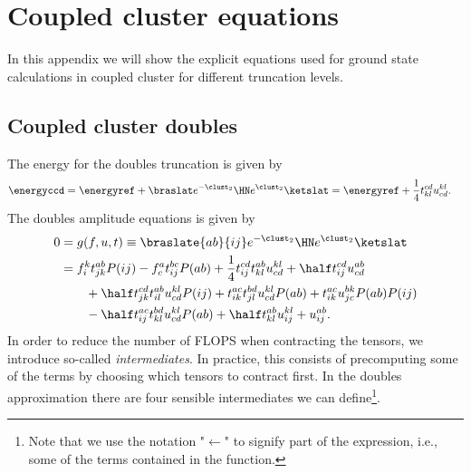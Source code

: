 \chapter{Coupled cluster equations}
    In this appendix we will show the explicit equations used for ground state
    calculations in coupled cluster for different truncation levels.

    \section{Coupled cluster doubles}
        The energy for the doubles truncation is given by
        \begin{align}
            \energyccd
            &= \energyref
            + \braslat e^{-\clust_2}\HN e^{\clust_2}\ketslat
            = \energyref
            + \frac{1}{4}t^{cd}_{kl} u^{kl}_{cd}.
        \end{align}
        The doubles amplitude equations is given by
        \begin{align}
            0 &= g(f, u, t)
            \equiv \braslate{ab}{ij}e^{-\clust_2}\HN e^{\clust_2}\ketslat
            \\
            &=
            f^{k}_{i} t^{ab}_{jk} P(ij)
            - f^{a}_{c} t^{bc}_{ij} P(ab)
            + \frac{1}{4} t^{cd}_{ij} t^{ab}_{kl} u^{kl}_{cd}
            + \half t^{cd}_{ij} u^{ab}_{cd}
            \nonumber \\
            &\qquad
            + \half t^{cd}_{jk} t^{ab}_{il} u^{kl}_{cd} P(ij)
            + t^{ac}_{ik} t^{bd}_{jl} u^{kl}_{cd} P(ab)
            + t^{ac}_{ik} u^{bk}_{jc} P(ab) P(ij)
            \nonumber \\
            &\qquad
            - \half t^{ac}_{ij} t^{bd}_{kl} u^{kl}_{cd} P(ab)
            + \half t^{ab}_{kl} u^{kl}_{ij}
            + u^{ab}_{ij}.
        \end{align}
        In order to reduce the number of FLOPS when contracting the tensors, we
        introduce so-called \emph{intermediates}\cite{hjorth2017advanced}. In
        practice, this consists of precomputing some of the terms by choosing
        which tensors to contract first. In the doubles approximation there are
        four sensible intermediates we can define\footnote{Note that we use the
        notation "$\gets$" to signify part of the expression, i.e., some of the
        terms contained in the function.}.
